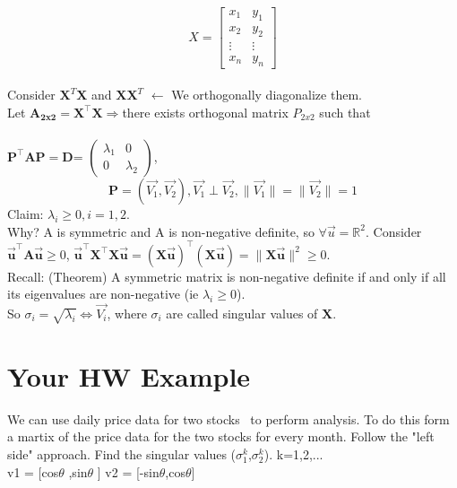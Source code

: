 \documentclass[11pt, oneside]{article}   	%
\begin{document}
\begin{Large}
\[
   X=
  \left[ {\begin{array}{cc}
   x_1 & y_1 \\
   x_2&  y_2 \\
   \vdots &\vdots\\
   x_n & y_n
  \end{array} } \right]
\]\\
Consider  $\mathbf{X}^T\mathbf{X}$ and  $\mathbf{XX}^T$ $\leftarrow$  We orthogonally diagonalize them.\\
 
Let $\mathbf{A_{2x2}}=\mathbf{X}^\top\mathbf{X} \Rightarrow $there exists orthogonal matrix $P_{2x2}$ such that\\
\\
\hspace{40pt}$\mathbf{P}^\top\mathbf{A}\mathbf{P}=\mathbf{D}$=
$\begin{pmatrix}
\lambda_1 & 0\\
0 & \lambda_2    
\end{pmatrix}$,
\begin{equation}
\mathbf{P}=(\Vec{V_1}, \Vec{V_2}), \Vec{V_1}\perp\Vec{V_2},
\|\Vec{V_1}\|=\|\Vec{V_2}\|=1
\end{equation}
Claim: $\lambda_i \geq 0, i = 1, 2$.\\
Why? A is symmetric and A is non-negative definite, so $\forall \Vec{u} = \mathbb{R}^2$.
Consider $\mathbf{\vec{u}}^\top\mathbf{A}\mathbf{\Vec{u}}\geq0$, $\mathbf{\Vec{u}}^\top\mathbf{X}^\top\mathbf{X}\mathbf{\Vec{u}} = (\mathbf{X}\mathbf{\Vec{u}})^\top(\mathbf{X}\mathbf{\Vec{u}}) = \|\mathbf{X}\mathbf{\Vec{u}}\|^2 \geq 0$. \\
Recall: (Theorem) A symmetric matrix is non-negative definite if and only if all its eigenvalues are non-negative (ie $\lambda_i \geq 0$).\\
So $\sigma_i = \sqrt{\lambda_i}\Leftrightarrow\Vec{V_i}$, where $\sigma_i$ are called singular values of $\mathbf{X}$.


\section*{Your HW Example}
We can use daily price data for two stocks  to perform analysis. To do this form a martix of the price data for the two stocks for every month. Follow the "left side" approach. Find the singular values ($\sigma_1^k$,$\sigma_2^k$). k=1,2,...\\
 v1 = [cos$\theta$ ,sin$\theta$ ] v2 = [-sin$\theta$,cos$\theta$]\\


\end{Large}
\end{document}
